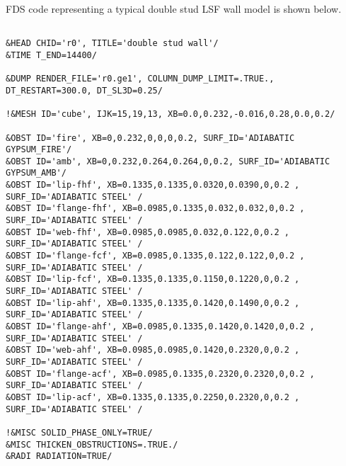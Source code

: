 FDS code representing a typical double stud LSF wall model is shown below.

\dotfill

\begin{lstlisting}
    
&HEAD CHID='r0', TITLE='double stud wall'/
&TIME T_END=14400/

&DUMP RENDER_FILE='r0.ge1', COLUMN_DUMP_LIMIT=.TRUE., DT_RESTART=300.0, DT_SL3D=0.25/

!&MESH ID='cube', IJK=15,19,13, XB=0.0,0.232,-0.016,0.28,0.0,0.2/

&OBST ID='fire', XB=0,0.232,0,0,0,0.2, SURF_ID='ADIABATIC GYPSUM_FIRE'/
&OBST ID='amb', XB=0,0.232,0.264,0.264,0,0.2, SURF_ID='ADIABATIC GYPSUM_AMB'/
&OBST ID='lip-fhf', XB=0.1335,0.1335,0.0320,0.0390,0,0.2 , SURF_ID='ADIABATIC STEEL' /
&OBST ID='flange-fhf', XB=0.0985,0.1335,0.032,0.032,0,0.2 , SURF_ID='ADIABATIC STEEL' /
&OBST ID='web-fhf', XB=0.0985,0.0985,0.032,0.122,0,0.2 , SURF_ID='ADIABATIC STEEL' /
&OBST ID='flange-fcf', XB=0.0985,0.1335,0.122,0.122,0,0.2 , SURF_ID='ADIABATIC STEEL' /
&OBST ID='lip-fcf', XB=0.1335,0.1335,0.1150,0.1220,0,0.2 , SURF_ID='ADIABATIC STEEL' /
&OBST ID='lip-ahf', XB=0.1335,0.1335,0.1420,0.1490,0,0.2 , SURF_ID='ADIABATIC STEEL' /
&OBST ID='flange-ahf', XB=0.0985,0.1335,0.1420,0.1420,0,0.2 , SURF_ID='ADIABATIC STEEL' /
&OBST ID='web-ahf', XB=0.0985,0.0985,0.1420,0.2320,0,0.2 , SURF_ID='ADIABATIC STEEL' /
&OBST ID='flange-acf', XB=0.0985,0.1335,0.2320,0.2320,0,0.2 , SURF_ID='ADIABATIC STEEL' /
&OBST ID='lip-acf', XB=0.1335,0.1335,0.2250,0.2320,0,0.2 , SURF_ID='ADIABATIC STEEL' /

!&MISC SOLID_PHASE_ONLY=TRUE/
&MISC THICKEN_OBSTRUCTIONS=.TRUE./
&RADI RADIATION=TRUE/


\end{lstlisting}

